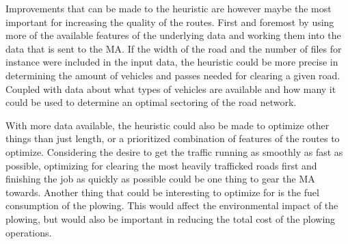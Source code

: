 Improvements that can be made to the heuristic are however maybe the most important for increasing the quality of the routes. First and foremost by using more of the available features of the underlying data and working them into the data that is sent to the MA. If the width of the road and the number of files for instance were included in the input data, the heuristic could be more precise in determining the amount of vehicles and passes needed for clearing a given road. Coupled with data about what types of vehicles are available and how many it could be used to determine an optimal sectoring of the road network.

With more data available, the heuristic could also be made to optimize other things than just length, or a prioritized combination of features of the routes to optimize. Considering the desire to get the traffic running as smoothly as fast as possible, optimizing for clearing the most heavily trafficked roads first and finishing the job as quickly as possible could be one thing to gear the MA towards. Another thing that could be interesting to optimize for is the fuel consumption of the plowing. This would affect the environmental impact of the plowing, but would also be important in reducing the total cost of the plowing operations.




\cleardoublepage
